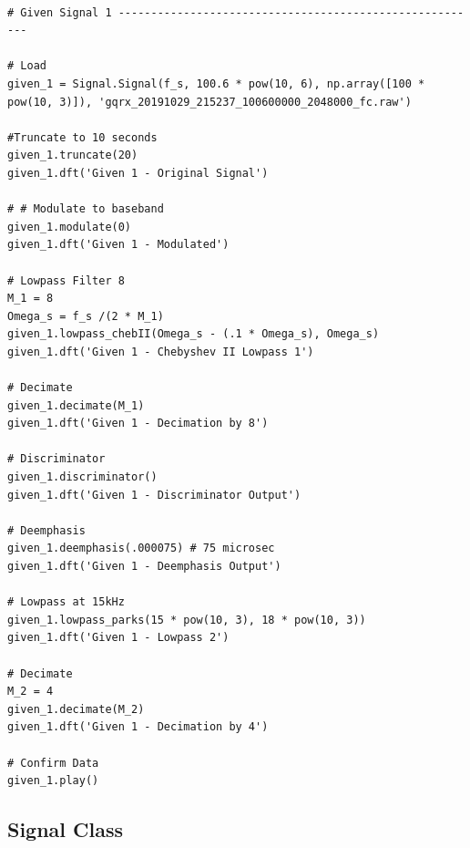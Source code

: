 \documentclass{article}
\begin{document}
\begin{lstlisting}

# Given Signal 1 --------------------------------------------------------

# Load
given_1 = Signal.Signal(f_s, 100.6 * pow(10, 6), np.array([100 * pow(10, 3)]), 'gqrx_20191029_215237_100600000_2048000_fc.raw')

#Truncate to 10 seconds
given_1.truncate(20)
given_1.dft('Given 1 - Original Signal')

# # Modulate to baseband
given_1.modulate(0)
given_1.dft('Given 1 - Modulated')

# Lowpass Filter 8
M_1 = 8
Omega_s = f_s /(2 * M_1)
given_1.lowpass_chebII(Omega_s - (.1 * Omega_s), Omega_s)
given_1.dft('Given 1 - Chebyshev II Lowpass 1')

# Decimate
given_1.decimate(M_1)
given_1.dft('Given 1 - Decimation by 8')

# Discriminator
given_1.discriminator()
given_1.dft('Given 1 - Discriminator Output')

# Deemphasis
given_1.deemphasis(.000075) # 75 microsec
given_1.dft('Given 1 - Deemphasis Output')

# Lowpass at 15kHz
given_1.lowpass_parks(15 * pow(10, 3), 18 * pow(10, 3))
given_1.dft('Given 1 - Lowpass 2')

# Decimate
M_2 = 4
given_1.decimate(M_2)
given_1.dft('Given 1 - Decimation by 4')

# Confirm Data
given_1.play()

\end{lstlisting}

\subsection{Signal Class}
\end{document}
